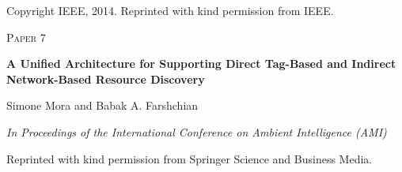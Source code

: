 \vspace{11cm}
\scriptsize Copyright IEEE, 2014. Reprinted with kind permission from IEEE.

\cleardoublepage


\cleardoublepage
\begin{flushright}
\textsc{\huge Paper 7}
\end{flushright}
\vspace{3cm}
\begin{center}
	\begin{framed}
		{\Large \textbf{A Unified Architecture for Supporting Direct Tag-Based and Indirect Network-Based Resource Discovery}}	
		\medskip
		
		Simone Mora and Babak A. Farshchian
		
		\medskip		
		\emph{In Proceedings of the International Conference on Ambient Intelligence (AMI)}
	\end{framed}	
\end{center}

\vspace{11cm}
\scriptsize Reprinted with kind permission from Springer Science and Business Media.

\cleardoublepage

